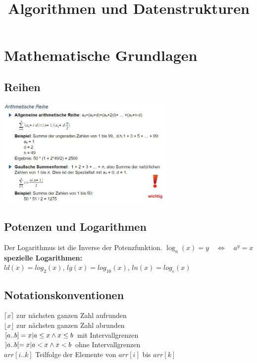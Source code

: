 \documentclass{scrreprt}
\title{\textbf{Algorithmen und Datenstrukturen}}
\author{}
\begin{document}
\maketitle
\pagebreak
\renewcommand{\contentsname}{Inhaltsverzeichnis}
\setcounter{tocdepth}{1}
\tableofcontents
\pagebreak
\chapter{Mathematische Grundlagen}
\section{Reihen}
\includegraphics[width=0.65\textwidth]{graphics/reihen-arithmetisch}
\section{Potenzen und Logarithmen}
Der Logarithmus ist die Inverse der Potenzfunktion. $\log_a(x) = y \quad \Longleftrightarrow  \quad a^y = x$
\\\textbf{spezielle Logarithmen:}
\\$ld(x)=log_2(x)$, $lg(x)=log_10(x)$, $ln(x)=log_e(x)$
\section{Notationskonventionen}
$\lceil x \rceil$ zur nächsten ganzen Zahl aufrunden
\\$\lfloor x \rfloor$ zur nächsten ganzen Zahl abrunden
\\$[a .. b] = {x \arrowvert a \leq x \wedge x \leq b}$ mit Intervallgrenzen
\\$]a .. b[ = {x \arrowvert a < x \wedge x < b}$ ohne Intervallgrenzen
\\$arr[i .. k]$ Teilfolge der Elemente von $arr[i]$ bis $arr[k]$
\end{document}
